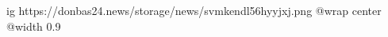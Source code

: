  
 
 
 
 

\ifcmt
  ig https://donbas24.news/storage/news/svmkendl56hyyjxj.png
  @wrap center
  @width 0.9
\fi
